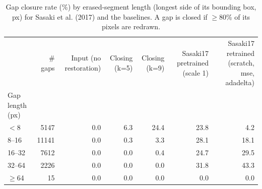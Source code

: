 \begin{table}
\caption{Gap closure rate (\%) by erased-segment length (longest side of its bounding box, px) for Sasaki et al. (2017) and the baselines. A gap is closed if $\geq$80\% of its pixels are redrawn.}
\label{tab:sasaki_gap_length}
\begin{tabular}{lrrrrrr}
\toprule
 & \# gaps & Input (no restoration) & Closing (k=5) & Closing (k=9) & Sasaki17 pretrained (scale 1) & Sasaki17 retrained (scratch, mse, adadelta) \\
Gap length (px) &  &  &  &  &  &  \\
\midrule
$<$8 & 5147 & 0.0 & 6.3 & 24.4 & 23.8 & 4.2 \\
8--16 & 11141 & 0.0 & 0.3 & 3.3 & 28.1 & 18.1 \\
16--32 & 7612 & 0.0 & 0.0 & 0.4 & 24.7 & 29.5 \\
32--64 & 2226 & 0.0 & 0.0 & 0.0 & 31.8 & 43.3 \\
$\geq$64 & 15 & 0.0 & 0.0 & 0.0 & 0.0 & 0.0 \\
\bottomrule
\end{tabular}
\end{table}
